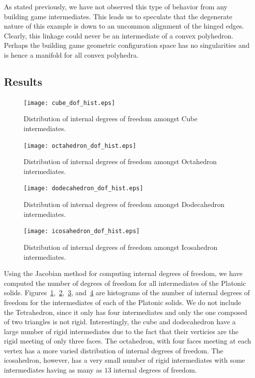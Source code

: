 As stated previously, we have not observed this type of behavior from any building game intermediates. This leads us to speculate that the degenerate nature of this example is down to an uncommon alignment of the hinged edges. Clearly, this linkage could never be an intermediate of a convex polyhedron. Perhaps the building game geometric configuration space has no singularities and is hence a manifold for all convex polyhedra.  

\subsection{Results}


\begin{figure}[ht]
\centering
  \texttt{[image: cube\_dof\_hist.eps]}
\caption{Distribution of internal degrees of freedom amongst Cube intermediates.}
\label{fig:CubeDoFHist}
\end{figure}

\begin{figure}[ht]
\centering
  \texttt{[image: octahedron\_dof\_hist.eps]}
\caption{Distribution of internal degrees of freedom amongst Octahedron intermediates.}
\label{fig:OctaDoFHist}
\end{figure}

\begin{figure}[ht]
\centering
  \texttt{[image: dodecahedron\_dof\_hist.eps]}
\caption{Distribution of internal degrees of freedom amongst Dodecahedron intermediates.}
\label{fig:DodecDoFHist}
\end{figure}

\begin{figure}[ht]
\centering
  \texttt{[image: icosahedron\_dof\_hist.eps]}
\caption{Distribution of internal degrees of freedom amongst Icosahedron intermediates.}
\label{fig:IcosaDoFHist}
\end{figure}

Using the Jacobian method for computing internal degrees of freedom, we have computed the number of degrees of freedom for all intermediates of the Platonic solids. Figures~\ref{fig:CubeDoFHist},~\ref{fig:OctaDoFHist},~\ref{fig:DodecDoFHist}, and~\ref{fig:IcosaDoFHist} are histograms of the number of internal degrees of freedom for the intermediates of each of the Platonic solids. We do not include the Tetrahedron, since it only has four intermediates and only the one composed of two triangles is not rigid. Interestingly, the cube and dodecahedron have a large number of rigid intermediates due  to the fact that their verticies are the rigid meeting of only three faces. The octahedron, with four faces meeting at each vertex has a more varied distribution of internal degrees of freedom. The icosahedron, however, has a very small number of rigid intermediates with some intermediates having as many as $13$ internal degrees of freedom. 

